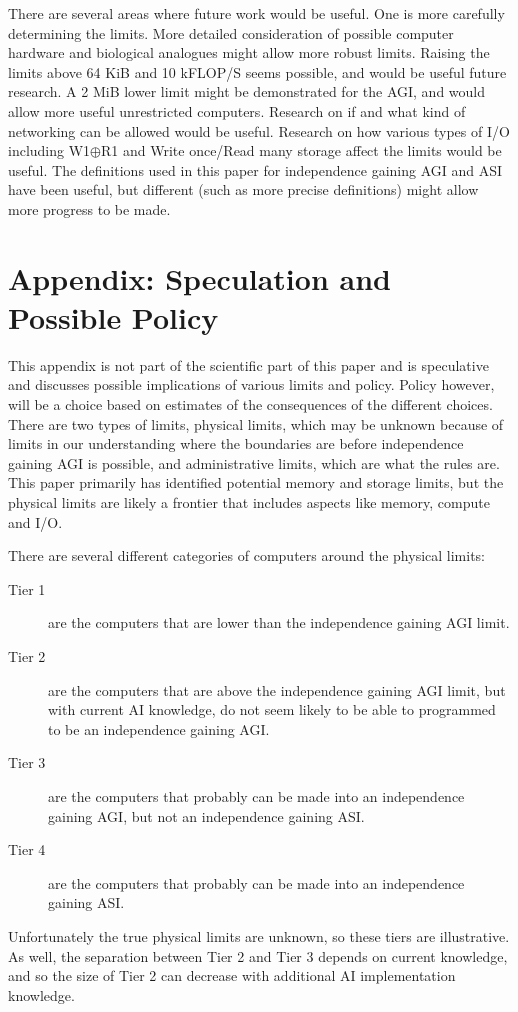 \documentclass[letterpaper,twocolumn]{article}
\begin{document}
There are several areas where future work would be useful. One is more
carefully determining the limits. More detailed consideration of
possible computer hardware and biological analogues might allow more
robust limits. Raising the limits above 64 KiB and 10 kFLOP/S seems
possible, and would be useful future research. A 2 MiB lower limit
might be demonstrated for the AGI, and would allow more useful
unrestricted computers. Research on if and what kind of networking can
be allowed would be useful. Research on how various types of I/O including
W1$\oplus$R1 and Write once/Read many storage affect the limits would be
useful. The definitions used in this paper for independence gaining
AGI and ASI have been useful, but different (such as more precise
definitions) might allow more progress to be made.

\section*{Appendix: Speculation and Possible Policy}

This appendix is not part of the scientific part of this paper and is
speculative and discusses possible implications of various limits and
policy. Policy however, will be a choice based on estimates of the
consequences of the different choices. There are two types of limits,
physical limits, which may be unknown because of limits in our
understanding where the boundaries are before independence gaining AGI
is possible, and administrative limits, which are what the rules
are. This paper primarily has identified potential memory and storage
limits, but the physical limits are likely a frontier that includes
aspects like memory, compute and I/O.


There are several different categories of computers around the physical limits:
\begin{description}
\item[Tier 1] are the computers that are lower than the independence gaining AGI limit.
\item[Tier 2] are the computers that are above the independence gaining AGI limit, but with current AI knowledge, do not seem likely to be able to programmed to be an independence gaining AGI.
\item[Tier 3] are the computers that probably can be made into an independence gaining AGI, but not an independence gaining ASI.
\item[Tier 4] are the computers that probably can be made into an independence gaining ASI.
\end{description}
Unfortunately the true physical limits are unknown, so these tiers are
illustrative. As well, the separation between Tier 2 and Tier 3
depends on current knowledge, and so the size of Tier 2 can decrease
with additional AI implementation knowledge.
\end{document}
